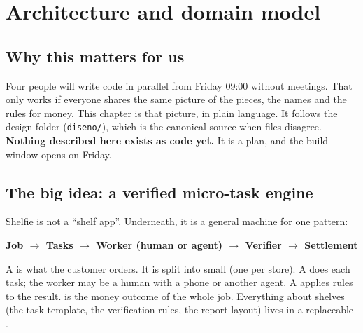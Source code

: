 \chapter{Architecture and domain model}
\newcommand{\cSevenCode}[1]{\texttt{\scriptsize #1}}

\section*{Why this matters for us}
Four people will write code in parallel from Friday 09:00 without meetings. That only works if everyone shares the same picture of the pieces, the names and the rules for money. This chapter is that picture, in plain language. It follows the design folder (\texttt{diseno/}), which is the canonical source when files disagree. \textbf{Nothing described here exists as code yet.} It is a plan, and the build window opens on Friday.

\section{The big idea: a verified micro-task engine}
Shelfie is not a ``shelf app''. Underneath, it is a general machine for one pattern:
\begin{center}
\sffamily\bfseries Job $\rightarrow$ Tasks $\rightarrow$ Worker (human or agent) $\rightarrow$ Verifier $\rightarrow$ Settlement
\end{center}
A  is what the customer orders. It is split into small  (one per store). A  does each task; the worker may be a human with a phone or another agent. A  applies rules to the result.  is the money outcome of the whole job. Everything about shelves (the task template, the verification rules, the report layout) lives in a replaceable .

